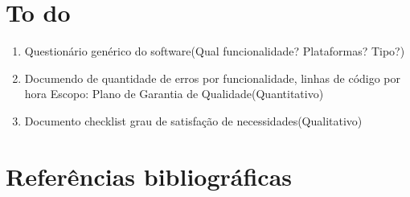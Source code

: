 \documentclass[	DIV=calc,%
							paper=a4,%
							fontsize=12pt,%
							onecolumn]{scrartcl}	 					%
\begin{document}
\section{To do}
\begin{enumerate}
	
	\item Questionário genérico do software(Qual funcionalidade? Plataformas? Tipo?)

	\item Documendo de quantidade de erros por funcionalidade, linhas de código por hora Escopo: Plano de Garantia de Qualidade(Quantitativo)

	\item Documento checklist grau de satisfação de necessidades(Qualitativo)

\end{enumerate}

\section{Referências bibliográficas}


\renewcommand\refname{

} %

 
\end{document}
